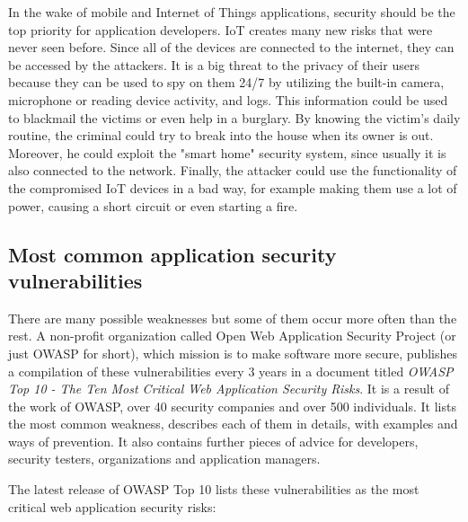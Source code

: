 \documentclass[a4paper]{article}
\begin{document}
In the wake of mobile and Internet of Things applications, security should be
the top priority for application developers. IoT creates many new risks that
were never seen before. Since all of the devices are connected to the internet,
they can be accessed by the attackers. It is a big threat to the privacy of
their users because they can be used to spy on them 24/7 by utilizing the
built-in camera, microphone or reading device activity, and logs. This
information could be used to blackmail the victims or even help in a burglary.
By knowing the victim's daily routine, the criminal could try to break into the
house when its owner is out. Moreover, he could exploit the "smart home"
security system, since usually it is also connected to the network. Finally,
the attacker could use the functionality of the compromised IoT devices in a
bad way, for example making them use a lot of power, causing a short circuit or
even starting a fire.

\newpage

\subsection{Most common application security vulnerabilities}

There are many possible weaknesses but some of them occur more often than the
rest. A non-profit organization called Open Web Application Security Project
(or just OWASP for short), which mission is to make software more secure,
publishes a compilation of these vulnerabilities every 3 years in a document
titled \textit{OWASP Top 10 - The Ten Most Critical Web Application Security
Risks}. It is a result of the work of OWASP, over 40 security companies and
over 500 individuals. It lists the most common weakness, describes each of them
in details, with examples and ways of prevention. It also contains further
pieces of advice for developers, security testers, organizations and
application managers.

The latest release of OWASP Top 10 lists these vulnerabilities as the most
critical web application security risks:
\end{document}
